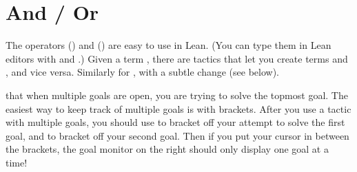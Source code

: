 \documentclass[letterpaper,10pt,english]{sphinxmanual}
\begin{document}
\section{And / Or}
\label{\detokenize{day1:and-or}}
\sphinxAtStartPar
The operators  () and  () are easy to use in Lean.
(You can type them in Lean editors with  and .)
Given a term ,
there are tactics that let you
create terms  and , and vice versa.
Similarly for , with a subtle change (see below).

\sphinxAtStartPar
{} that when multiple goals are open, you are trying to solve the topmost goal.
The easiest way to keep track of multiple goals is with brackets.
After you use a tactic with multiple goals, you should use \sphinxcode{\sphinxupquote{\{ \},}} to bracket off your attempt to solve the first goal,
and \sphinxcode{\sphinxupquote{\{ \},}} to bracket off your second goal.
Then if you put your cursor in between the brackets, the goal monitor on the right should only display one goal at a time!
\end{document}
